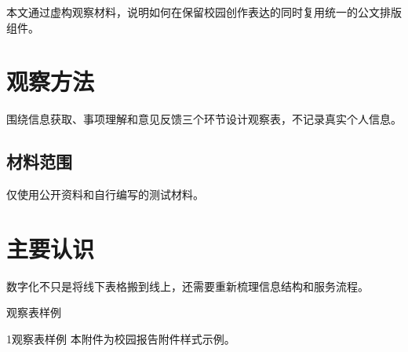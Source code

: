 \documentclass{sysuredhead}
\begin{document}
\RedHeadMakeHead

本文通过虚构观察材料，说明如何在保留校园创作表达的同时复用统一的公文排版组件。

\section{观察方法}

围绕信息获取、事项理解和意见反馈三个环节设计观察表，不记录真实个人信息。

\subsection{材料范围}

仅使用公开资料和自行编写的测试材料。

\section{主要认识}

数字化不只是将线下表格搬到线上，还需要重新梳理信息结构和服务流程。

\begin{RedHeadAttachments}
  \item 观察表样例
\end{RedHeadAttachments}

\RedHeadMakeClosing

\begin{RedHeadAttachment}{1}{观察表样例}
本附件为校园报告附件样式示例。
\end{RedHeadAttachment}

\RedHeadMakeImprint
\end{document}
